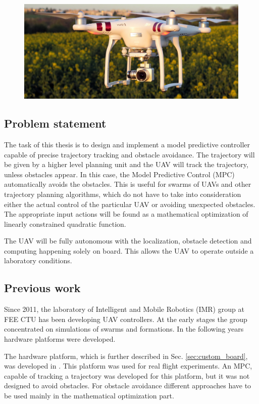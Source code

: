 \documentclass[a4paper,11pt,titlepage]{article}
\begin{document}
\begin{figure}[h]
\centering
\includegraphics[width=1\linewidth]{fig/phantom.jpg}
\label{fig:phantom}
\end{figure}

\subsection{Problem statement}
The task of this thesis is to design and implement a model predictive controller capable of precise trajectory tracking and obstacle avoidance. The trajectory will be given by a higher level planning unit and the UAV will track the trajectory, unless obstacles appear. In this case, the Model Predictive Control (MPC) automatically avoids the obstacles. This is useful for swarms of UAVs and other trajectory planning algorithms, which do not have to take into consideration either the actual control of the particular UAV or avoiding unexpected obstacles. The appropriate input actions will be found as a mathematical optimization of linearly constrained quadratic function. 

The UAV will be fully autonomous with the localization, obstacle detection and computing happening solely on board. This allows the UAV to operate outside a laboratory conditions. 

\subsection{Previous work}
Since 2011, the laboratory of Intelligent and Mobile Robotics (IMR) group at FEE CTU has been developing UAV controllers. At the early stages the group concentrated on simulations of swarms and formations. In the following years hardware platforms were developed. 

The hardware platform, which is further described in Sec. \ref{sec:custom_board}, was developed in \cite{tomas}. This platform was used for real flight experiments. An MPC, capable of tracking a trajectory was developed for this platform, but it was not designed to avoid obstacles. For obstacle avoidance different approaches have to be used mainly in the mathematical optimization part.
\end{document}
